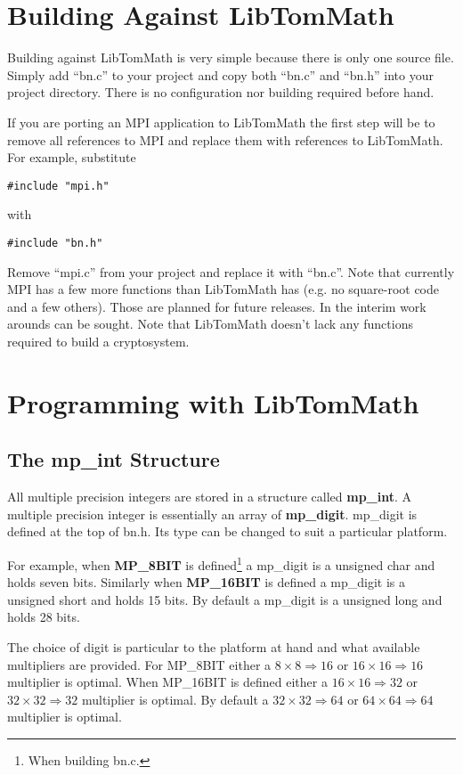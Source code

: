 \documentclass{article}
\begin{document}
\section{Building Against LibTomMath}

Building against LibTomMath is very simple because there is only one source file.  Simply add ``bn.c'' to your project and 
copy both ``bn.c'' and ``bn.h'' into your project directory.  There is no configuration nor building required before hand.

If you are porting an MPI application to LibTomMath the first step will be to remove all references to MPI and replace them 
with references to LibTomMath.  For example, substitute 

\begin{verbatim}
#include "mpi.h"
\end{verbatim}

with 

\begin{verbatim}
#include "bn.h"
\end{verbatim}

Remove ``mpi.c'' from your project and replace it with ``bn.c''.  Note that currently MPI has a few more functions than
LibTomMath has (e.g. no square-root code and a few others).  Those are planned for future releases.  In the interim work 
arounds can be sought.  Note that LibTomMath doesn't lack any functions required to build a cryptosystem.

\section{Programming with LibTomMath}

\subsection{The mp\_int Structure}
All multiple precision integers are stored in a structure called \textbf{mp\_int}.  A multiple precision integer is
essentially an array of \textbf{mp\_digit}.  mp\_digit is defined at the top of bn.h.  Its type can be changed to suit
a particular platform.  

For example, when \textbf{MP\_8BIT} is defined\footnote{When building bn.c.} a mp\_digit is a unsigned char and holds 
seven bits.  Similarly when \textbf{MP\_16BIT} is defined a mp\_digit is a unsigned short and holds 15 bits.  
By default a mp\_digit is a unsigned long and holds 28 bits.  

The choice of digit is particular to the platform at hand and what available multipliers are provided.  For 
MP\_8BIT either a $8 \times 8 \Rightarrow 16$ or $16 \times 16 \Rightarrow 16$ multiplier is optimal.  When 
MP\_16BIT is defined either a $16 \times 16 \Rightarrow 32$ or $32 \times 32 \Rightarrow 32$ multiplier is optimal.  By
default a $32 \times 32 \Rightarrow 64$ or $64 \times 64 \Rightarrow 64$ multiplier is optimal.  
\end{document}
